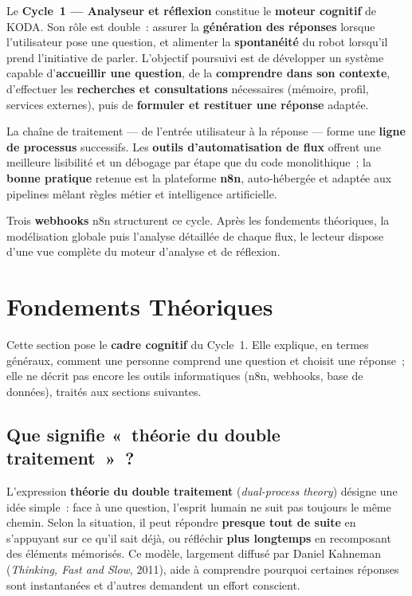 \documentclass[a4paper,12pt]{report}
\begin{document}
	Le \textbf{Cycle~1 --- Analyseur et réflexion} constitue le \textbf{moteur cognitif} de KODA.
	Son rôle est double~: assurer la \textbf{génération des réponses} lorsque l'utilisateur
	pose une question, et alimenter la \textbf{spontanéité} du robot lorsqu'il prend
	l'initiative de parler. L'objectif poursuivi est de développer un système capable
	d'\textbf{accueillir une question}, de la \textbf{comprendre dans son contexte},
	d'effectuer les \textbf{recherches et consultations} nécessaires (mémoire, profil,
	services externes), puis de \textbf{formuler et restituer une réponse} adaptée.
	
	La chaîne de traitement --- de l'entrée utilisateur à la réponse --- forme une
	\textbf{ligne de processus} successifs. Les \textbf{outils d'automatisation de flux}
	offrent une meilleure lisibilité et un débogage par étape que du code monolithique~;
	la \textbf{bonne pratique} retenue est la plateforme \textbf{n8n}, auto-hébergée et
	adaptée aux pipelines mêlant règles métier et intelligence artificielle.
	
	Trois \textbf{webhooks} n8n structurent ce cycle. Après les fondements théoriques, la
	modélisation globale puis l'analyse détaillée de chaque flux, le lecteur dispose d'une
	vue complète du moteur d'analyse et de réflexion.
	
	\section{Fondements Théoriques}
	
	Cette section pose le \textbf{cadre cognitif} du Cycle~1. Elle explique, en termes
	généraux, comment une personne comprend une question et choisit une réponse~; elle ne
	décrit pas encore les outils informatiques (n8n, webhooks, base de données), traités
	aux sections suivantes.
	
	\subsection{Que signifie «~théorie du double traitement~»~?}
	
	L'expression \textbf{théorie du double traitement} (\textit{dual-process theory}) désigne
	une idée simple~: face à une question, l'esprit humain ne suit pas toujours le même
	chemin. Selon la situation, il peut répondre \textbf{presque tout de suite} en s'appuyant
	sur ce qu'il sait déjà, ou réfléchir \textbf{plus longtemps} en recomposant des
	éléments mémorisés. Ce modèle, largement diffusé par Daniel Kahneman
	(\textit{Thinking, Fast and Slow}, 2011), aide à comprendre pourquoi certaines réponses
	sont instantanées et d'autres demandent un effort conscient.
	
\end{document}
